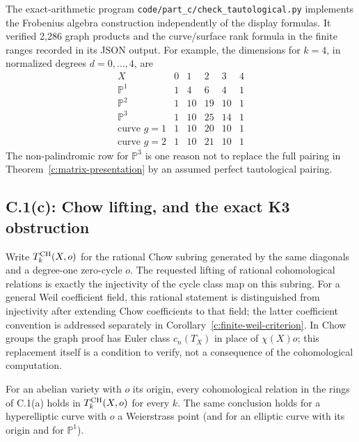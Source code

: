 The exact-arithmetic program \texttt{code/part\_c/check\_tautological.py} implements the Frobenius algebra construction independently of the display formulas. It verified 2,286 graph products and the curve/surface rank formula in the finite ranges recorded in its JSON output. For example, the dimensions for $k=4$, in normalized degrees $d=0,\ldots,4$, are
\[
\begin{array}{c|ccccc}
 X&0&1&2&3&4\\\hline
 \mathbb P^1&1&4&6&4&1\\
 \mathbb P^2&1&10&19&10&1\\
 \mathbb P^3&1&10&25&14&1\\
 \text{curve }g=1&1&10&20&10&1\\
 \text{curve }g=2&1&10&21&10&1
\end{array}
\]
The non-palindromic row for $\mathbb P^3$ is one reason not to replace the full pairing in Theorem~\ref{c:matrix-presentation} by an assumed perfect tautological pairing.

\subsection{C.1(c): Chow lifting, and the exact K3 obstruction}

Write $T_k^{\operatorname{CH}}(X,o)$ for the rational Chow subring generated by the same diagonals and a degree-one zero-cycle $o$. The requested lifting of rational cohomological relations is exactly the injectivity of the cycle class map on this subring. For a general Weil coefficient field, this rational statement is distinguished from injectivity after extending Chow coefficients to that field; the latter coefficient convention is addressed separately in Corollary~\ref{c:finite-weil-criterion}. In Chow groups the graph proof has Euler class $c_n(T_X)$ in place of $\chi(X)o$; this replacement itself is a condition to verify, not a consequence of the cohomological computation.

\begin{theorem}
\label{c:chow-positive}
For an abelian variety with $o$ its origin, every cohomological relation in the rings of C.1(a) holds in $T_k^{\operatorname{CH}}(X,o)$ for every $k$. The same conclusion holds for a hyperelliptic curve with $o$ a Weierstrass point (and for an elliptic curve with its origin and for $\mathbb P^1$).
\end{theorem}

